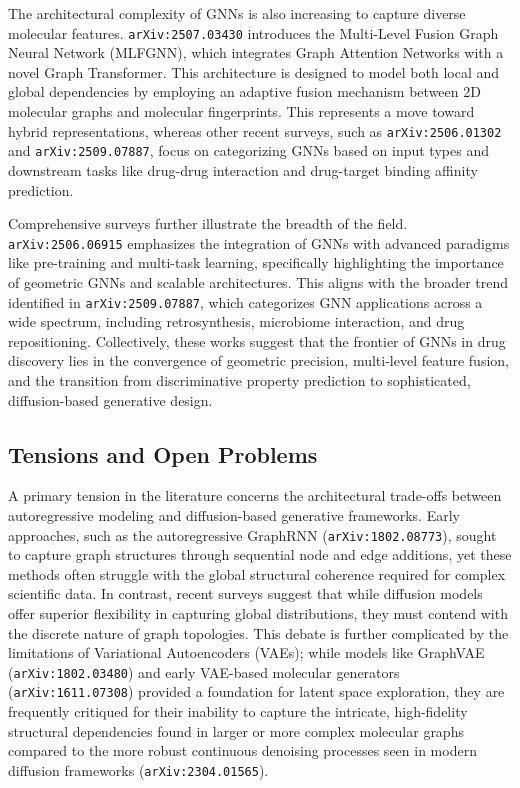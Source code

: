 \documentclass[11pt]{article}
\begin{document}
The architectural complexity of GNNs is also increasing to capture diverse molecular features. \texttt{arXiv:2507.03430} introduces the Multi-Level Fusion Graph Neural Network (MLFGNN), which integrates Graph Attention Networks with a novel Graph Transformer. This architecture is designed to model both local and global dependencies by employing an adaptive fusion mechanism between 2D molecular graphs and molecular fingerprints. This represents a move toward hybrid representations, whereas other recent surveys, such as \texttt{arXiv:2506.01302} and \texttt{arXiv:2509.07887}, focus on categorizing GNNs based on input types and downstream tasks like drug-drug interaction and drug-target binding affinity prediction.

Comprehensive surveys further illustrate the breadth of the field. \texttt{arXiv:2506.06915} emphasizes the integration of GNNs with advanced paradigms like pre-training and multi-task learning, specifically highlighting the importance of geometric GNNs and scalable architectures. This aligns with the broader trend identified in \texttt{arXiv:2509.07887}, which categorizes GNN applications across a wide spectrum, including retrosynthesis, microbiome interaction, and drug repositioning. Collectively, these works suggest that the frontier of GNNs in drug discovery lies in the convergence of geometric precision, multi-level feature fusion, and the transition from discriminative property prediction to sophisticated, diffusion-based generative design.

\subsection{Tensions and Open Problems}

A primary tension in the literature concerns the architectural trade-offs between autoregressive modeling and diffusion-based generative frameworks. Early approaches, such as the autoregressive GraphRNN (\texttt{arXiv:1802.08773}), sought to capture graph structures through sequential node and edge additions, yet these methods often struggle with the global structural coherence required for complex scientific data. In contrast, recent surveys suggest that while diffusion models offer superior flexibility in capturing global distributions, they must contend with the discrete nature of graph topologies. This debate is further complicated by the limitations of Variational Autoencoders (VAEs); while models like GraphVAE (\texttt{arXiv:1802.03480}) and early VAE-based molecular generators (\texttt{arXiv:1611.07308}) provided a foundation for latent space exploration, they are frequently critiqued for their inability to capture the intricate, high-fidelity structural dependencies found in larger or more complex molecular graphs compared to the more robust continuous denoising processes seen in modern diffusion frameworks (\texttt{arXiv:2304.01565}).
\end{document}
